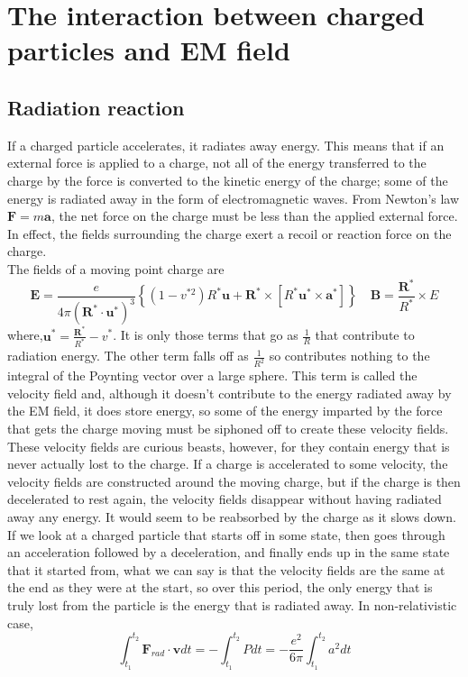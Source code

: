 \section{The interaction between charged particles and EM field}
\subsection{Radiation reaction}
If a charged particle accelerates, it radiates away energy. This means that if an external force is applied to a charge, not all of the energy transferred to the charge by the force is converted to the kinetic energy of the charge; some of the energy is radiated away in the form of electromagnetic waves.  From Newton's law $\bm{F}=m\bm{a}$, the net force on the charge must be less than the applied external force. In effect, the fields surrounding the charge exert a recoil or reaction force on the charge.\\
The fields of a moving point charge are
\[\bm{E} = \frac{e}{4\pi(\bm{R}^*\cdot\bm{u}^*)^3}\left\{(1-v^{*2})R^*\bm{u} + \bm{R}^* \times [R^*\bm{u}^* \times \bm{a}^*]\right\} \quad \bm{B} = \frac{\bm{R}^*}{R^*}\times E\]
where,$\bm{u}^* = \frac{\bm{R}^*}{R^*}-v^*$.
It is only those terms that go as $\frac{1}{R}$ that contribute to radiation energy. The other term falls off as $\frac{1}{R^2}$ so contributes nothing to the integral of the Poynting vector over a large sphere. This term is called the velocity field and, although it doesn't contribute to the energy radiated away by the EM field, it does store energy, so some of the energy imparted by the force that gets the charge moving must be siphoned off to create these velocity fields. These velocity fields are curious beasts, however, for they contain energy that is never actually lost to the charge. If a charge is accelerated to some velocity, the velocity fields are constructed around the moving charge, but if the charge is then decelerated to rest again, the velocity fields disappear without having radiated away any energy. It would seem to be reabsorbed by the charge as it slows down. \\
If we look at a charged particle that starts off in some state, then goes through an acceleration followed by a deceleration, and finally ends up in the same state that it started from, what we can say is that the velocity fields are the same at the end as they were at the start, so over this period, the only energy that is truly lost from the particle is the energy that is radiated away. In non-relativistic case,
\[\int_{t_{1}}^{t_{2}}\bm{F}_{rad}\cdot\bm{v}dt = -\int_{t_{1}}^{t_{2}}Pdt = -\frac{e^{2}}{6\pi }\int_{t_{1}}^{t_{2}}a^{2}dt \]
